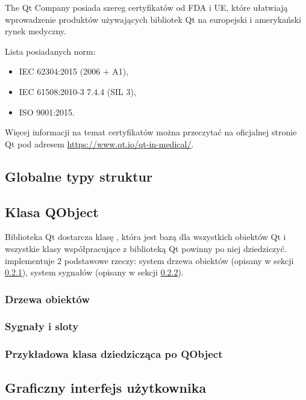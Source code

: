 \par
The Qt Company posiada szereg certyfikatów od FDA i UE, które ułatwiają wprowadzenie produktów używających bibliotek Qt na europejski i amerykański rynek medyczny.
\par
Lista posiadanych norm:
\begin{itemize}
    \item IEC 62304:2015 (2006 + A1),
    \item IEC 61508:2010-3 7.4.4 (SIL 3),
    \item ISO 9001:2015.
\end{itemize}
Więcej informacji na temat certyfikatów można przeczytać na oficjalnej stronie Qt pod adresem \url{https://www.qt.io/qt-in-medical/}.

\subsection{Globalne typy struktur}
\label{sec:qt-typedefs}


\subsection{Klasa QObject}

\qtclassExplanations

\par
Biblioteka Qt dostarcza klasę , która jest bazą dla wszystkich obiektów Qt i wszystkie klasy współpracujące z biblioteką Qt powinny po niej dziedziczyć.
 implementuje 2 podstawowe rzeczy: system drzewa obiektów (opisany w sekcji \ref{sec:qt-pareting}), system sygnałów (opisany w sekcji \ref{sec:qt-signals}).

\subsubsection{Drzewa obiektów}
\label{sec:qt-pareting}


\subsubsection{Sygnały i sloty}
\label{sec:qt-signals}


\subsubsection{Przykładowa klasa dziedzicząca po QObject}


\subsection{Graficzny interfejs użytkownika}
\label{sec:qt-gui}

